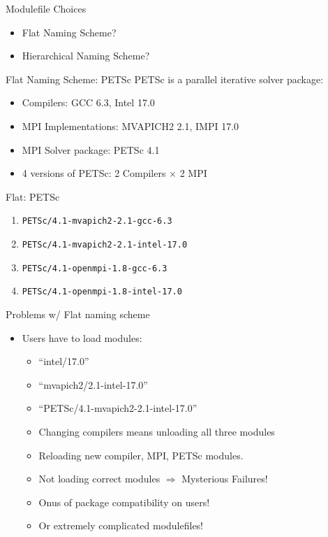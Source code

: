 \documentclass{beamer}
\begin{document}
\begin{frame}{Modulefile Choices}
  \begin{itemize}
    \item Flat Naming Scheme?
    \item Hierarchical Naming Scheme?
  \end{itemize}
\end{frame}

\begin{frame}{Flat Naming Scheme: PETSc}
  PETSc is a parallel iterative solver package:
  \begin{itemize}
    \item Compilers: GCC 6.3, Intel 17.0
    \item MPI Implementations: MVAPICH2 2.1, IMPI 17.0
    \item MPI Solver package: PETSc 4.1
    \item 4 versions of PETSc: 2 Compilers $\times$ 2 MPI
  \end{itemize}
\end{frame}

\begin{frame}{Flat: PETSc }
  \begin{enumerate}
  \item \texttt{PETSc/4.1-mvapich2-2.1-gcc-6.3}
  \item \texttt{PETSc/4.1-mvapich2-2.1-intel-17.0}
  \item \texttt{PETSc/4.1-openmpi-1.8-gcc-6.3}
  \item \texttt{PETSc/4.1-openmpi-1.8-intel-17.0}
  \end{enumerate}
\end{frame}

\begin{frame}{Problems w/ Flat naming scheme}
  \begin{itemize}
    \item Users have to load modules:
      \begin{itemize}
        \item ``intel/17.0''
        \item ``mvapich2/2.1-intel-17.0''
        \item ``PETSc/4.1-mvapich2-2.1-intel-17.0''
        \item Changing compilers means unloading all three modules
        \item Reloading new compiler, MPI, PETSc modules.
        \item Not loading correct modules $\Rightarrow$ Mysterious Failures!
        \item Onus of package compatibility on users!
        \item Or extremely complicated modulefiles!
      \end{itemize}
  \end{itemize}
\end{frame}
\end{document}
